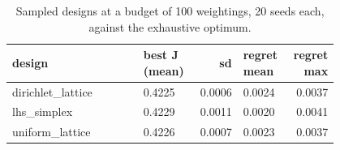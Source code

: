 \begin{table}[htbp]
\centering\scriptsize
\caption{Sampled designs at a budget of 100 weightings, 20 seeds each, against the exhaustive optimum.}
\label{tab:designs_short}
\setlength{\tabcolsep}{3pt}
\begin{tabular}{p{0.451\linewidth}p{0.189\linewidth}rp{0.160\linewidth}r}
\toprule
design & best J (mean) & sd & regret mean & regret max \\
\midrule
dirichlet\_\allowbreak{}lattice & 0.4225 & 0.0006 & 0.0024 & 0.0037 \\
lhs\_\allowbreak{}simplex & 0.4229 & 0.0011 & 0.0020 & 0.0041 \\
uniform\_\allowbreak{}lattice & 0.4226 & 0.0007 & 0.0023 & 0.0037 \\
\bottomrule
\end{tabular}
\end{table}
